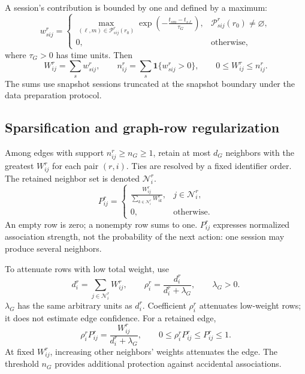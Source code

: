 \documentclass[12pt,a4paper]{article}
\newcommand{\ind}{\mathbf 1}
\theoremstyle{plainru}
\begin{document}
A session's contribution is bounded by one and defined by a maximum:
\begin{equation}\label{eq:model-session-edge}
w^r_{sij}=
\begin{cases}
\displaystyle\max_{(\ell,m)\in\mathcal P^r_{sij}(r_0)}
\exp\!\left(-\frac{t_{sm}-t_{s\ell}}{\tau_G}\right),
&\mathcal P^r_{sij}(r_0)\ne\varnothing,\\[0.4em]
0,&\text{otherwise},
\end{cases}
\end{equation}
where $\tau_G>0$ has time units. Then
\begin{equation}\label{eq:model-edge-weight}
W^r_{ij}=\sum_s w^r_{sij},\qquad
n^r_{ij}=\sum_s\ind\{w^r_{sij}>0\},\qquad
0\le W^r_{ij}\le n^r_{ij}.
\end{equation}
The sums use snapshot sessions truncated at the snapshot boundary
under the data preparation protocol.

\subsection{Sparsification and graph-row regularization}

Among edges with support $n^r_{ij}\ge n_G\ge1$, retain
at most $d_G$ neighbors with the greatest $W^r_{ij}$ for each pair $(r,i)$.
Ties are resolved by a fixed identifier order.
The retained neighbor set is denoted $\mathcal N^r_i$.
\begin{equation}\label{eq:model-transition}
P^r_{ij}=
\begin{cases}
\displaystyle\frac{W^r_{ij}}
 {\sum_{k\in\mathcal N^r_i}W^r_{ik}},
&j\in\mathcal N^r_i,\\[0.4em]
0,&\text{otherwise}.
\end{cases}
\end{equation}
An empty row is zero; a nonempty row sums to one.
$P^r_{ij}$ expresses normalized association strength, not the probability
of the next action: one session may produce several neighbors.

To attenuate rows with low total weight, use
\begin{equation}\label{eq:model-edge-confidence}
d^r_i=\sum_{j\in\mathcal N^r_i}W^r_{ij},\qquad
\rho^r_i=\frac{d^r_i}{d^r_i+\lambda_G},\qquad \lambda_G>0.
\end{equation}
$\lambda_G$ has the same arbitrary units as $d^r_i$.
Coefficient $\rho^r_i$ attenuates low-weight rows;
it does not estimate edge confidence. For a retained edge,
\begin{equation}\label{eq:model-row-regularization}
\rho_i^rP_{ij}^r=\frac{W_{ij}^r}{d_i^r+\lambda_G},
\qquad
0\le \rho_i^rP_{ij}^r\le P_{ij}^r\le1.
\end{equation}
At fixed $W_{ij}^r$, increasing other neighbors' weights attenuates the edge.
The threshold $n_G$ provides additional protection against accidental associations.
\end{document}
